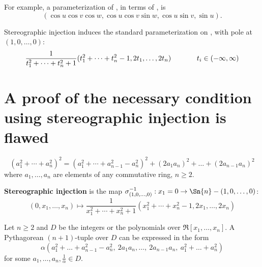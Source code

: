 For example, a parameterization of , in terms of ,
is 
\[
	(\cos u \cos v \cos w, \cos u \cos v \sin w, \cos u \sin v, \sin u).
\]

\begin{rmk}
Stereographic injection induces the standard parameterization on ,
with pole at $(1,0,\ldots,0)$:
\begin{equation}
\label{eq:param}
\frac{1}{t_1^2 + \cdots + t_n^2 + 1} 
	(t_1^2 + \cdots + t_n^2 - 1, 2t_1, \ldots, 2t_n)
	\hspace{.5in}
	t_i \in (-\infty,\infty)
\end{equation}
\end{rmk}

\section{A proof of the necessary condition using stereographic injection is flawed}

\begin{lemma}[Ammei]	%
\label{lem:ammei}
\begin{equation}
\label{eq:ammei}
	(a_1^2 + \cdots + a_n^2)^2 = 
	(a_1^2 + \cdots + a_{n-1}^2 - a_n^2)^2 + (2a_1a_n)^2 + \ldots + 
	(2a_{n-1}a_n)^2
\end{equation}
where $a_1,\ldots,a_n$ are elements of any commutative ring, $n \geq 2$.
\end{lemma}

\begin{defn2}
{\rm 
{\bf Stereographic injection} is the map 
$\sigma^{-1}_{(1,0,\ldots,0)}: x_{1}=0 \rightarrow \Sn{n} - (1,0,\ldots,0)$:
\begin{equation}
\label{eq:injection}
(0,x_1,\ldots,x_n) \mapsto
	\frac{1}{x_1^2 + \cdots + x_n^2 + 1} 
	(x_1^2 + \cdots + x_n^2 - 1, 2x_1, \ldots, 2x_n)
\end{equation}
}
\end{defn2}

\begin{theorem}
\label{thm:necessaryn}
Let $n \geq 2$ and $D$ be the integers or the polynomials 
over $\Re[x_1,\ldots,x_n]$.
A Pythagorean $(n+1)$-tuple over $D$ can be expressed in the form
\begin{equation}
\label{eq:pyth2}
	\alpha (a_1^2 + \ldots + a_{n-1}^2 - a_n^2,
		\ 2a_1a_n,\ldots,\ 2a_{n-1}a_n,
		\ a_1^2 + \ldots + a_n^2)
\end{equation}
for some $a_1,\ldots,a_n,\frac{1}{\alpha} \in D$.
\end{theorem}


